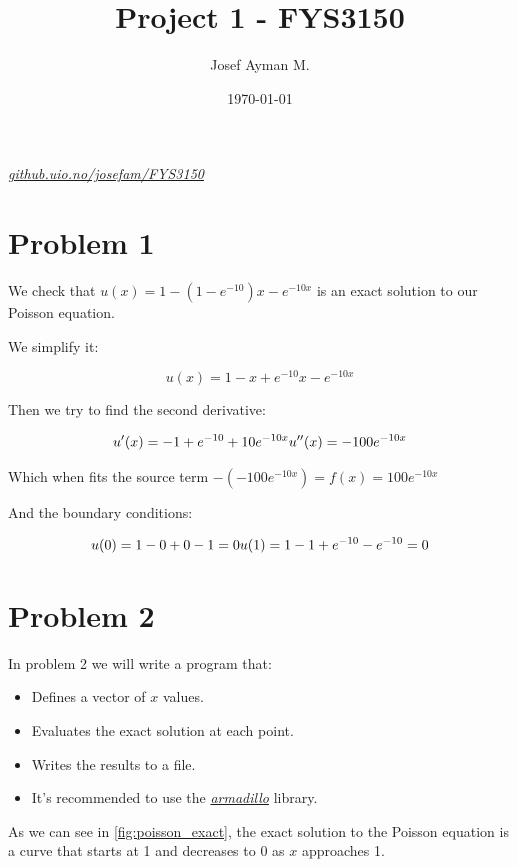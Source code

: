 \documentclass[english,notitlepage]{revtex4-1}  %
\begin{document}
\title{Project 1 - FYS3150}               %
\author{Josef Ayman M.}                      %
\date{\today}                             %
\noaffiliation                            %


\maketitle

\textit{
    \href{https://github.uio.no/josefam/FYS3150}{github.uio.no/josefam/FYS3150}
}

\section*{Problem 1}
We check that $u(x) = 1 - (1 - e^{-10}) x - e^{-10 x}$ is an exact solution to our Poisson equation.

We simplify it:

\[
    u(x) = 1-x+e^{-10}x-e^{-10x}
\]

Then we try to find the second derivative:

\[
    u'(x)=-1+e^{-10}+10e^{-10x} \\
    u''(x) =-100e^{-10x}
\]


Which when fits the source term $-(-100e^{-10x}) = f(x) = 100e^{-10x}$

And the boundary conditions:

\[
    u(0)=1-0+0-1=0 \\
    u(1)=1-1+e^{-10}-e^{-10}=0
\]

\section*{Problem 2}
In problem 2 we will write a program that:

\begin{itemize}
    \item Defines a vector of $x$ values.
    \item Evaluates the exact solution at each point.
    \item Writes the results to a file.
    \item It's recommended to use the \textit{\href{https://arma.sourceforge.net/}{armadillo}} library.
\end{itemize}

As we can see in \figurename{ \ref{fig:poisson_exact}}, the exact solution to the Poisson equation is a curve that starts at 1 and decreases to 0 as $x$ approaches 1.
\end{document}

